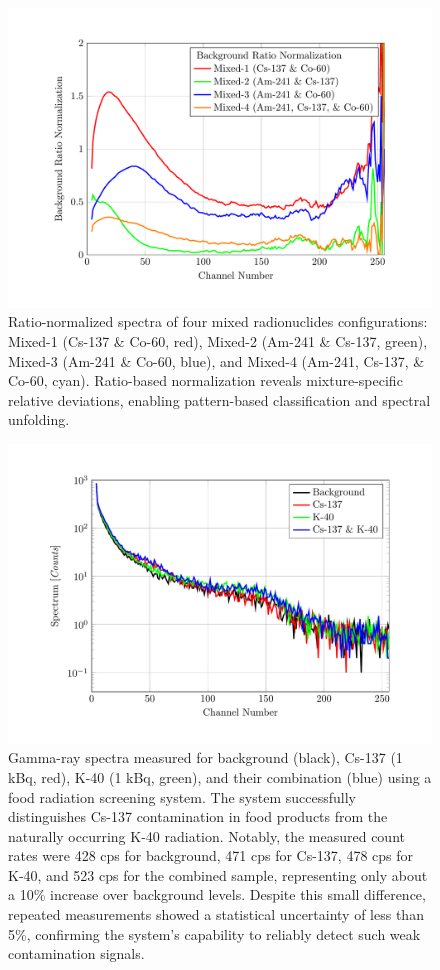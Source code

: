 \documentclass[10pt]{wlscirep}
\begin{document}
\newpage

\begin{figure}[ht]
\centering
\includegraphics[width=\linewidth]{figure/fig06_CSBRS.pdf}
\caption{Ratio-normalized spectra of four mixed radionuclides configurations: Mixed-1 (Cs-137 \& Co-60, red), Mixed-2 (Am-241 \& Cs-137, green), Mixed-3 (Am-241 \& Co-60, blue), and Mixed-4 (Am-241, Cs-137, \& Co-60, cyan). Ratio-based normalization reveals mixture-specific relative deviations, enabling pattern-based classification and spectral unfolding.}
\label{fig:fi_CSBRS}
\end{figure}

\begin{figure}[ht]
\centering
\includegraphics[width=\linewidth]{figure/fig07_FI_SPE.pdf}
\caption{Gamma-ray spectra measured for background (black), Cs-137 (1 kBq, red), K-40 (1 kBq, green), and their combination (blue) using a food radiation screening system. The system successfully distinguishes Cs-137 contamination in food products from the naturally occurring K-40 radiation. Notably, the measured count rates were 428 cps for background, 471 cps for Cs-137, 478 cps for K-40, and 523 cps for the combined sample, representing only about a 10\% increase over background levels. Despite this small difference, repeated measurements showed a statistical uncertainty of less than 5\%, confirming the system's capability to reliably detect such weak contamination signals.}
\label{fig:fi_spe}
\end{figure}
\end{document}
